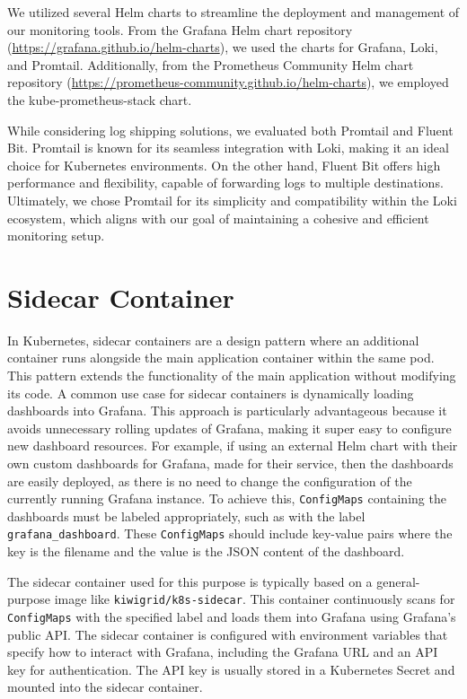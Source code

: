 We utilized several Helm charts to streamline the deployment and management of our monitoring tools. From the Grafana Helm chart repository (\url{https://grafana.github.io/helm-charts}), we used the charts for Grafana, Loki, and Promtail. Additionally, from the Prometheus Community Helm chart repository (\url{https://prometheus-community.github.io/helm-charts}), we employed the kube-prometheus-stack chart.

While considering log shipping solutions, we evaluated both Promtail and Fluent Bit. Promtail is known for its seamless integration with Loki, making it an ideal choice for Kubernetes environments. On the other hand, Fluent Bit offers high performance and flexibility, capable of forwarding logs to multiple destinations. Ultimately, we chose Promtail for its simplicity and compatibility within the Loki ecosystem, which aligns with our goal of maintaining a cohesive and efficient monitoring setup.

\section{Sidecar Container}
In Kubernetes, sidecar containers are a design pattern where an additional container runs alongside the main application container within the same pod. This pattern extends the functionality of the main application without modifying its code. A common use case for sidecar containers is dynamically loading dashboards into Grafana. This approach is particularly advantageous because it avoids unnecessary rolling updates of Grafana, making it super easy to configure new dashboard resources. For example, if using an external Helm chart with their own custom dashboards for Grafana, made for their service, then the dashboards are easily deployed, as there is no need to change the configuration of the currently running Grafana instance. To achieve this, \texttt{ConfigMaps} containing the dashboards must be labeled appropriately, such as with the label \texttt{grafana\_dashboard}. These \texttt{ConfigMaps} should include key-value pairs where the key is the filename and the value is the JSON content of the dashboard.

The sidecar container used for this purpose is typically based on a general-purpose image like \texttt{kiwigrid/k8s-sidecar}. This container continuously scans for \texttt{ConfigMaps} with the specified label and loads them into Grafana using Grafana's public API. The sidecar container is configured with environment variables that specify how to interact with Grafana, including the Grafana URL and an API key for authentication. The API key is usually stored in a Kubernetes Secret and mounted into the sidecar container.


